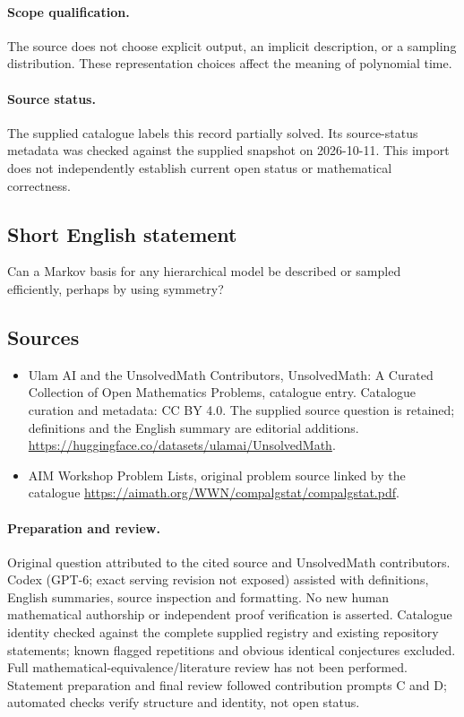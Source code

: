 \documentclass[11pt]{article}
\begin{document}
\paragraph{Scope qualification.}
The source does not choose explicit output, an implicit description, or a sampling distribution. These representation choices affect the meaning of polynomial time.
\paragraph{Source status.}
The supplied catalogue labels this record partially solved. Its source-status metadata was checked against the supplied snapshot on 2026-10-11. This import does not independently establish current open status or mathematical correctness.
\subsection{Short English statement}
Can a Markov basis for any hierarchical model be described or sampled efficiently, perhaps by using symmetry?
\subsection{Sources}
\begin{itemize}
\item[S1] Ulam AI and the UnsolvedMath Contributors, UnsolvedMath: A Curated Collection of Open Mathematics Problems, catalogue entry. Catalogue curation and metadata: CC BY 4.0. The supplied source question is retained; definitions and the English summary are editorial additions.
\url{https://huggingface.co/datasets/ulamai/UnsolvedMath}.
\item[S2] AIM Workshop Problem Lists, original problem source linked by the catalogue
\url{https://aimath.org/WWN/compalgstat/compalgstat.pdf}.
\end{itemize}
\paragraph{Preparation and review.}
Original question attributed to the cited source and UnsolvedMath contributors. Codex (GPT-6; exact serving revision not exposed) assisted with definitions, English summaries, source inspection and formatting. No new human mathematical authorship or independent proof verification is asserted. Catalogue identity checked against the complete supplied registry and existing repository statements; known flagged repetitions and obvious identical conjectures excluded. Full mathematical-equivalence/literature review has not been performed. Statement preparation and final review followed contribution prompts C and D; automated checks verify structure and identity, not open status.
\label{end:statement}
\end{document}
